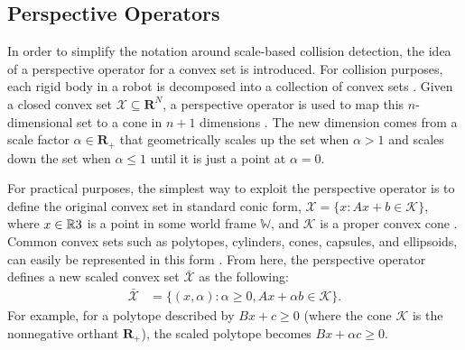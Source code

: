 %
%
\subsection{Perspective Operators} \label{sec:cdcol:perspective}
In order to simplify the notation around scale-based collision detection, the idea of a perspective operator for a convex set is introduced. For collision purposes, each rigid body in a robot is decomposed into a collection of convex sets \cite{schulman2013a}.
Given a closed convex set $\mathcal{X} \subseteq \mathbf{R}^N$, a perspective operator is used to map this $n$-dimensional set to a cone in $n+1$ dimensions \cite{marcucci2023, marcucci, rockafellar1997, hiriart-urruty1993}.
The new dimension comes from a scale factor $\alpha \in \mathbf{R}_+$ that geometrically scales up the set when $\alpha > 1$ and scales down the set when $\alpha \leq 1$ until it is just a point at $\alpha = 0$. 

For practical purposes, the simplest way to exploit the perspective operator is to define the original convex set in standard conic form, $\mathcal{X} = \{x : Ax + b \in \mathcal{K}\}$, where $x \in \mathbb{R}{3}$ is a point in some world frame $\mathbb{W}$, and $\mathcal{K}$ is a proper convex cone \cite{boyd2004, lobo1998}. Common convex sets such as polytopes, cylinders, cones, capsules, and ellipsoids, can easily be represented in this form \cite{tracy2023b}. From here, the perspective operator defines a new scaled convex set $\bar{\mathcal{X}}$ as the following:
%
\begin{align}
    \bar{\mathcal{X}} &= \{(x, \alpha) : \alpha \geq 0, Ax + \alpha b \in \mathcal{K}\}.
\end{align}
%
For example, for a polytope described by $Bx + c \geq 0$ (where the cone $\mathcal{K}$ is the nonnegative orthant $\mathbf{R}_+$), the scaled polytope becomes $Bx + \alpha c \geq 0$.

